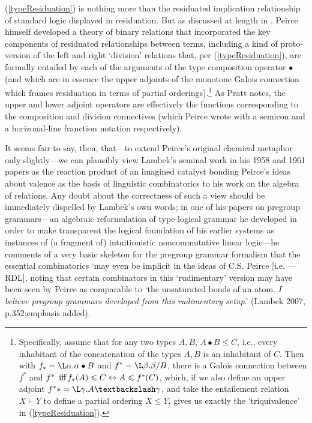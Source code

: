 \documentclass[output=paper,colorlinks,citecolor=brown]{langscibook}
\begin{document}
\noindent
(\ref{typeResiduation}) is nothing more than the residuated implication
relationship of standard logic displayed in residuation.  But as
discussed at length in \citet{pratt92}, Peirce himself developed a theory of
binary relations that incorporated the key components of residuated
relationships between terms, including a kind of proto-version of the
left and right `division' relations that, per (\ref{typeResiduation}), are
formally entailed by each of the arguments of the type composition
operator $\bullet$ (and which are in essence the upper adjoints of the
monotone Galois connection which frames residuation in terms of
partial orderings).\footnote{Specifically, assume that for any two
types $A,B$, $A\bullet B \leqslant C$, i.e., every inhabitant of the
concatenation of the types $A, B$ is an inhabitant of $C$. Then with
$f_\ast = \L\alpha. \alpha\bullet B$ and $f^\ast = \L \beta. \beta/B$,
there is a Galois connection between $f^\ast$ and $f^\ast \textrm{\,
iff\,} f_\ast(A) \leqslant C \Leftrightarrow A\leqslant f^\ast(C)$,
which, if we also define an upper adjoint $f^\ast\ast = \L
\gamma. A\bsl\gamma$, and take the entailement relation $X\vdash
Y$ to define a partial ordering $X\leqslant Y$, gives us exactly the
`triquivalence' in (\ref{typeResiduation}).} As Pratt notes, the upper and
lower adjoint operators are effectively the functions corresponding to
the composition and division connectives (which Peirce wrote with a
semicon and a horizonal-line franction notation respectively).

It seems fair to say, then, that---to extend Peirce's original
chemical metaphor only slightly---we can plausibly view Lambek's
seminal work in his 1958 and 1961 papers as the reaction product of an
imagined catalyst bonding Peirce's ideas about valence as the basis of
linguistic combinatorics to his work on the algebra of relations. Any
doubt about the correctness of such a view should be immediately
dispelled by Lambek's own words; in one of his papers on pregroup
grammars---an algebraic reformulation of type-logical grammar he
developed in order to make transparent the logical foundation of his
earlier systems as instances of (a fragment of) intuitionistic
noncommutative linear logic---he comments of a very basic skeleton for
the pregroup grammar formalism that the essential combinatorics `may
even be implicit in the ideas of C.S. Peirce [i.e. \citet{peirce1897}
---RDL], noting that certain combinators in this `rudimentary' version
may have been seen by Peirce as comparable to `the unsaturated bonds
of an atom. \textsl{I believe pregroup grammars developed from this
rudimentary setup}.' (Lambek 2007, p.352;\nocite{lambek2007a}emphasis added).
\end{document}
